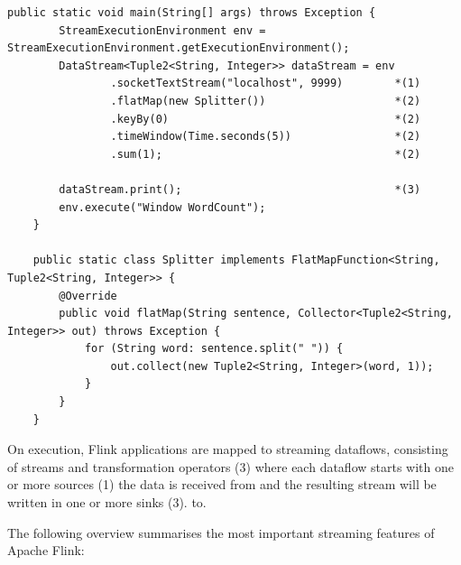 \begin{lstlisting}[caption={Basic Apache Flink streaming application}, captionpos=b, label={lst:basicflink}]
public static void main(String[] args) throws Exception {
        StreamExecutionEnvironment env = StreamExecutionEnvironment.getExecutionEnvironment();
        DataStream<Tuple2<String, Integer>> dataStream = env
                .socketTextStream("localhost", 9999)        *(1)
                .flatMap(new Splitter())                    *(2)
                .keyBy(0)                                   *(2)
                .timeWindow(Time.seconds(5))                *(2)
                .sum(1);                                    *(2)

        dataStream.print();                                 *(3)
        env.execute("Window WordCount");
    }

    public static class Splitter implements FlatMapFunction<String, Tuple2<String, Integer>> {
        @Override
        public void flatMap(String sentence, Collector<Tuple2<String, Integer>> out) throws Exception {
            for (String word: sentence.split(" ")) {
                out.collect(new Tuple2<String, Integer>(word, 1));
            }
        }
    }
\end{lstlisting}

On execution, Flink applications are mapped to streaming dataflows, consisting of streams
and transformation operators (3) where each dataflow starts with one or more sources (1)
the data is received from and the resulting stream will be written in one or more sinks (3).
to.

The following overview summarises the most important streaming features of Apache Flink:

